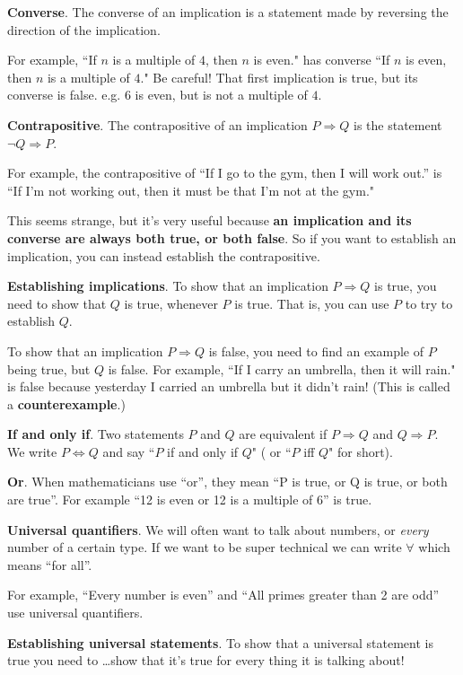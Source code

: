 \documentclass[11pt]{article}
\theoremstyle{definition}
\numberwithin{thm}{section}
\begin{document}
\textbf{Converse}. The converse of an implication is a statement made by reversing the direction of the implication.

For example, ``If $n$ is a multiple of $4$, then $n$ is even." has converse ``If $n$ is even, then $n$ is a multiple of $4$." Be careful! That first implication is true, but its converse is false. e.g. $6$ is even, but is not a multiple of $4$.

\textbf{Contrapositive}. The contrapositive of an implication $P \Rightarrow Q$ is the statement $\neg Q \Rightarrow P$. 

For example, the contrapositive of ``If I go to the gym, then I will work out.'' is ``If I'm not working out, then it must be that I'm not at the gym."

This seems strange, but it's very useful because \textbf{an implication and its converse are always both true, or both false}. So if you want to establish an implication, you can instead establish the contrapositive.

\textbf{Establishing implications}. To show that an implication $P \Rightarrow Q$ is true, you need to show that $Q$ is true, whenever $P$ is true. That is, you can use $P$ to try to establish $Q$.

To show that an implication $P \Rightarrow Q$ is false, you need to find an example of $P$ being true, but $Q$ is false. For example, ``If I carry an umbrella, then it will rain." is false because yesterday I carried an umbrella but it didn't rain! (This is called a \textbf{counterexample}.)

\textbf{If and only if}. Two statements $P$ and $Q$ are equivalent if $P \Rightarrow Q$ and $Q \Rightarrow P$. We write $P \Leftrightarrow Q$ and say ``$P$ if and only if $Q$" ( or ``$P$ iff $Q$" for short).

\textbf{Or}. When mathematicians use ``or'', they mean ``P is true, or Q is true, or both are true''. For example ``12 is even or 12 is a multiple of 6'' is true.

\textbf{Universal quantifiers}. We will often want to talk about  numbers, or \textit{every} number of a certain type. If we want to be super technical we can write $\forall$ which means ``for all''.

For example, ``Every number is even'' and ``All primes greater than 2 are odd'' use universal quantifiers.

\textbf{Establishing universal statements}. To show that a universal statement is true you need to \ldots show that it's true for every thing it is talking about!
\end{document}
